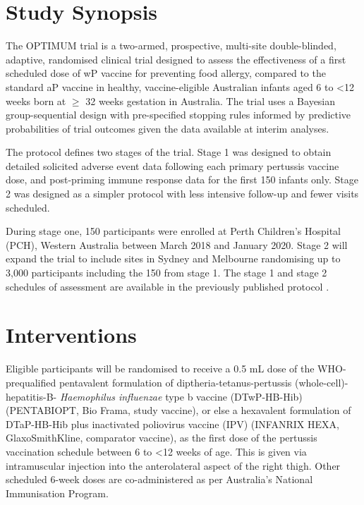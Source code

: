 \documentclass{bmcart}
\begin{document}
\section*{Study Synopsis}

The OPTIMUM trial is a two-armed, prospective, multi-site double-blinded, adaptive, randomised clinical trial designed to assess the effectiveness of a first scheduled dose of wP vaccine for preventing food allergy, compared to the standard aP vaccine in healthy, vaccine-eligible Australian infants aged 6 to \textless12 weeks born at \(\geq\) 32 weeks gestation in Australia.
The trial uses a Bayesian group-sequential design with pre-specified stopping rules informed by predictive probabilities of trial outcomes given the data available at interim analyses.

The protocol defines two stages of the trial.
Stage 1 was designed to obtain detailed solicited adverse event data following each primary pertussis vaccine dose, and post-priming immune response data for the first 150 infants only. 
Stage 2 was designed as a simpler protocol with less intensive follow-up and fewer visits scheduled.

During stage one, 150 participants were enrolled at Perth Children's Hospital (PCH), Western Australia between March 2018 and January 2020.
Stage 2 will expand the trial to include sites in Sydney and Melbourne randomising up to 3,000 participants including the 150 from stage 1.
The stage 1 and stage 2 schedules of assessment are available in the previously published protocol \cite{perez2020}.

\section*{Interventions}

Eligible participants will be randomised to receive a 0.5 mL dose of the WHO-prequalified pentavalent formulation of diptheria-tetanus-pertussis (whole-cell)-hepatitis-B- \textit{Haemophilus influenzae} type b vaccine (DTwP-HB-Hib) (PENTABIO\textregistered PT, Bio Frama, study vaccine), or else a hexavalent formulation of DTaP-HB-Hib plus inactivated poliovirus vaccine (IPV) (INFANRIX HEXA\textregistered, GlaxoSmithKline, comparator vaccine), as the first dose of the pertussis vaccination schedule between 6 to \textless 12 weeks of age.
This is given via intramuscular injection into the anterolateral aspect of the right thigh.
Other scheduled 6-week doses are co-administered as per Australia's National Immunisation Program.
\end{document}
